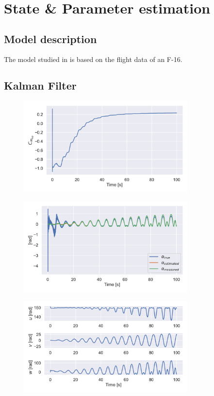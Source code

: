 \chapter{State \& Parameter estimation}
\label{chapter:state-parameter-estimation}

\section{Model description}
The model studied in is based on the flight data of an F-16.

\section{Kalman Filter}


\begin{figure}[h]
\centering
  \includegraphics[width=0.8\textwidth]{figures/estate_estimation_wash.pdf}
  \caption{}
\end{figure}

\begin{figure}[h]
\centering
  \includegraphics[width=0.8\textwidth]{figures/estate_estimation_alpha.pdf}
  \caption{}
\end{figure}

\begin{figure}[h]
\centering
  \includegraphics[width=0.8\textwidth]{figures/estate_estimation_output.pdf}
  \caption{}
\end{figure}